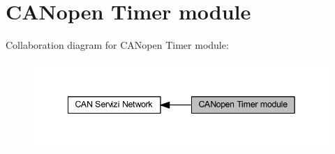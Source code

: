 \hypertarget{group___c_a_nopen__timer__module}{}\section{C\+A\+Nopen Timer module}
\label{group___c_a_nopen__timer__module}
Collaboration diagram for C\+A\+Nopen Timer module\+:\nopagebreak
\begin{figure}[H]
\begin{center}
\leavevmode
\includegraphics[width=342pt]{group___c_a_nopen__timer__module}
\end{center}
\end{figure}

